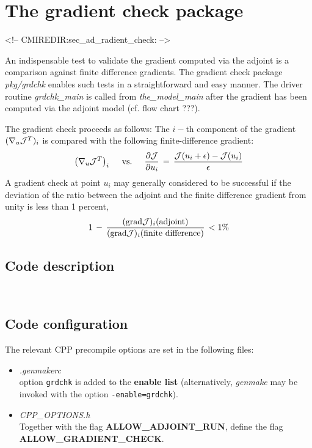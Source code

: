 
\section{The gradient check package}
\label{sec:ad_gradient_check}
\label{sec_ad_radient_check}
\begin{rawhtml}
<!-- CMIREDIR:sec_ad_radient_check: -->
\end{rawhtml}

An indispensable test to validate the gradient computed
via the adjoint is a comparison against finite difference
gradients.
The gradient check package {\it pkg/grdchk} enables such tests
in a straightforward and easy manner.
The driver routine {\it grdchk\_main} is called from
{\it the\_model\_main} after the gradient has been computed
via the adjoint model (cf. flow chart ???).

The gradient check proceeds as follows:
The $i-$th component of the gradient $ (\nabla _{u}{\cal J}^T)_i $
is compared with  the following finite-difference gradient:
\[
\left(\nabla _{u}{\cal J}^T  \right)_i \quad \text{ vs. } \quad
\frac{\partial {\cal J}}{\partial u_i} \, = \,
\frac{ {\cal J}(u_i + \epsilon) - {\cal J}(u_i)}{\epsilon}
\]
A gradient check at point $u_i$ may generally considered to be successful
if the deviation of the ratio between the adjoint and the 
finite difference gradient from unity is less than 1 percent,
\[
1 \, - \, 
\frac{({\rm grad}{\cal J})_i (\text{adjoint})}
{({\rm grad}{\cal J})_i (\text{finite difference})} \, < 1 \%
\]

\subsection{Code description}
~

\subsection{Code configuration}
%
The relevant CPP precompile options are set
in the following files:
%
\begin{itemize}
%
\item {\it .genmakerc} \\
option {\tt grdchk} is added to the {\bf enable list}
(alternatively, {\it genmake} may be invoked with the
option {\tt -enable=grdchk}).
%
\item {\it CPP\_OPTIONS.h} \\
Together with the flag 
{\bf ALLOW\_ADJOINT\_RUN}, define the flag
{\bf ALLOW\_GRADIENT\_CHECK}.
%
\end{itemize}

